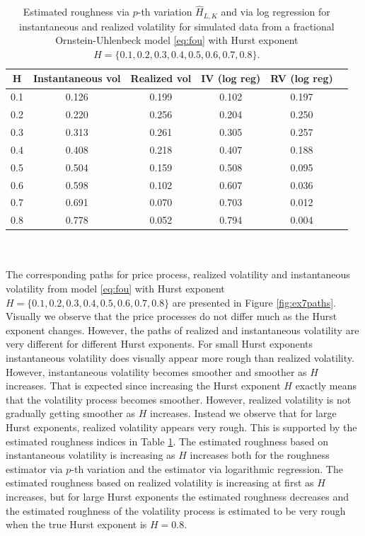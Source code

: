 \documentclass{article}
\begin{document}
\begin{table}[htbp]
    \centering
    \begin{tabular}{cccccc}
        \toprule
        H & Instantaneous vol & Realized vol & IV (log reg) & RV (log reg)\\
        \midrule
        0.1 & 0.126 & 0.199 & 0.102 & 0.197\\
        0.2 & 0.220 & 0.256 & 0.204 & 0.250\\
        0.3 & 0.313 & 0.261 & 0.305 & 0.257\\
        0.4 & 0.408 & 0.218 & 0.407 & 0.188\\
        0.5 & 0.504 & 0.159 & 0.508 & 0.095\\
        0.6 & 0.598 & 0.102 & 0.607 & 0.036\\
        0.7 & 0.691 & 0.070 & 0.703 & 0.012\\
        0.8 & 0.778 & 0.052 & 0.794 & 0.004\\
        \bottomrule
    \end{tabular}
    \caption{Estimated roughness via $p$-th variation $\hat{H}_{L,K}$ and via log regression for instantaneous and realized volatility for simulated data from a fractional Ornstein-Uhlenbeck model \eqref{eq:fou} with Hurst exponent $H=\{0.1,0.2,0.3,0.4,0.5,0.6,0.7,0.8\}$.}
    \label{tab:ex7table}
\end{table}\\\\
The corresponding paths for price process, realized volatility and instantaneous volatility from model \ref{eq:fou} with Hurst exponent $H=\{0.1,0.2,0.3,0.4,0.5,0.6,0.7,0.8\}$ are presented in Figure \ref{fig:ex7paths}. Visually we observe that the price processes do not differ much as the Hurst exponent changes. However, the paths of realized and instantaneous volatility are very different for different Hurst exponents. For small Hurst exponents instantaneous volatility does visually appear more rough than realized volatility. However, instantaneous volatility becomes smoother and smoother as $H$ increases. That is expected since increasing the Hurst exponent $H$ exactly means that the volatility process becomes smoother. However, realized volatility is not gradually getting smoother as $H$ increases. Instead we observe that for large Hurst exponents, realized volatility appears very rough. This is supported by the estimated roughness indices in Table \ref{tab:ex7table}. The estimated roughness based on instantaneous volatility is increasing as $H$ increases both for the roughness estimator via $p$-th variation and the estimator via logarithmic regression. The estimated roughness based on realized volatility is increasing at first as $H$ increases, but for large Hurst exponents the estimated roughness decreases and the estimated roughness of the volatility process is estimated to be very rough when the true Hurst exponent is $H=0.8$. 
\end{document}
